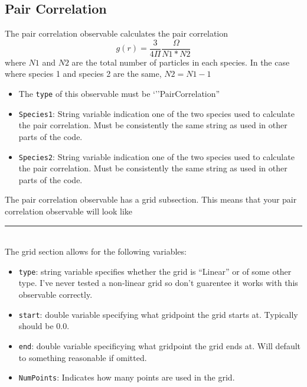 \documentclass{book}
\begin{document}
\subsection{Pair Correlation}
The pair correlation observable calculates the pair correlation   
$$g(r)=\frac{3}{4\Pi}\frac{\Omega}{N1*N2}$$ where $N1$ and $N2$ are
the total number of particles in each species. In the case where
species 1 and species 2 are the same, $N2=N1-1$ 
\begin{itemize}
\item The \texttt{type} of this observable must be
`''PairCorrelation''
\item \texttt{Species1}: String variable indication one of the two species used to calculate the
  pair correlation. Must be consistently the same string as used in
  other parts of the code.
\item \texttt{Species2}: String variable indication one of the two species used to calculate the
  pair correlation. Must be consistently the same string as used in
  other parts of the code.
\end{itemize}
The pair correlation observable has a grid subsection. This means that
your pair correlation observable will look like \\
\rule{0.6cm}{0cm}\\
The grid section allows for the following variables:
\begin{itemize}
\item \texttt{type}: string variable specifies whether the grid is
  ``Linear'' or of some other type. I've never tested a non-linear
  grid so don't guarentee it works with this observable correctly.
\item \texttt{start}: double variable specifying what gridpoint the grid
  starts at. Typically should be 0.0.
\item \texttt{end}: double variable specificying what gridpoint the
  grid ends at. Will default to something reasonable if omitted.
\item \texttt{NumPoints}: Indicates how many points are used in the grid.
\end{itemize}
\end{document}
